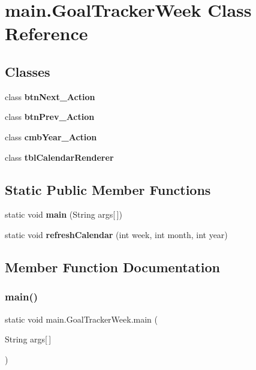 \section{main.\+Goal\+Tracker\+Week Class Reference}
\label{classmain_1_1_goal_tracker_week}
\subsection*{Classes}
\begin{DoxyCompactItemize}
\item 
class {\bfseries btn\+Next\+\_\+\+Action}
\item 
class {\bfseries btn\+Prev\+\_\+\+Action}
\item 
class {\bfseries cmb\+Year\+\_\+\+Action}
\item 
class {\bfseries tbl\+Calendar\+Renderer}
\end{DoxyCompactItemize}
\subsection*{Static Public Member Functions}
\begin{DoxyCompactItemize}
\item 
static void \textbf{ main} (String args[$\,$])
\item 
static void \textbf{ refresh\+Calendar} (int week, int month, int year)
\end{DoxyCompactItemize}


\subsection{Member Function Documentation}
\mbox{\label{classmain_1_1_goal_tracker_week_a03418a3f1ae0a64e023b764cdba2fedb}} 
\subsubsection{main()}
{\footnotesize\ttfamily static void main.\+Goal\+Tracker\+Week.\+main (\begin{DoxyParamCaption}\item[{String}]{args[$\,$] }\end{DoxyParamCaption})\hspace{0.3cm}{\ttfamily [static]}}

\mbox{\label{classmain_1_1_goal_tracker_week_a7508790a7e52f9446de6160ad44bb938}} 
